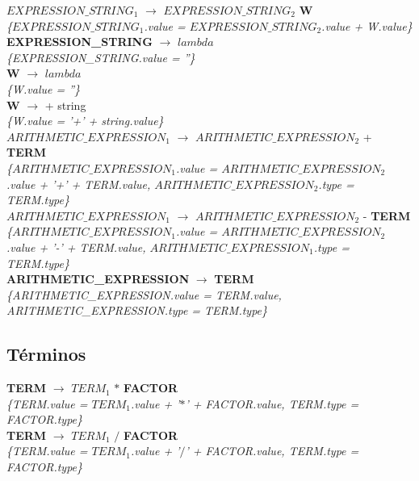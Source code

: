 \documentclass[10pt,a4paper]{article}
\begin{document}
\textbf{$EXPRESSION\_STRING_1$} $\rightarrow$ \textbf{$EXPRESSION\_STRING_2$} \textbf{W}
\\ \textit{\{$EXPRESSION\_STRING_1$.value =  $EXPRESSION\_STRING_2$.value + W.value\}} \\

\textbf{EXPRESSION\_STRING} $\rightarrow$  $lambda$ \\ 
\textit{\{EXPRESSION\_STRING.value = ''\}} \\

\textbf{W} $\rightarrow$  $lambda$ \\ 
\textit{\{W.value = ''\}} \\

\textbf{W} $\rightarrow$ + string \\ 
\textit{\{W.value = '+' + string.value\}} \\


\textbf{$ARITHMETIC\_EXPRESSION_1$} $\rightarrow$ \textbf{$ARITHMETIC\_EXPRESSION_2$} + \textbf{TERM} \\
\textit{\{$ARITHMETIC\_EXPRESSION_1$.value = $ARITHMETIC\_EXPRESSION_2$.value + '+' + TERM.value, $ARITHMETIC\_EXPRESSION_2$.type = TERM.type\}} \\

\textbf{$ARITHMETIC\_EXPRESSION_1$} $\rightarrow$ \textbf{$ARITHMETIC\_EXPRESSION_2$} - \textbf{TERM}  \\
\textit{\{$ARITHMETIC\_EXPRESSION_1$.value = $ARITHMETIC\_EXPRESSION_2$.value + '-' + TERM.value, $ARITHMETIC\_EXPRESSION_1$.type = TERM.type\}} \\

\textbf{ARITHMETIC\_EXPRESSION} $\rightarrow$ \textbf{TERM} \\
\textit{\{ARITHMETIC\_EXPRESSION.value = TERM.value, ARITHMETIC\_EXPRESSION.type = TERM.type\}}  \\

\subsection{Términos}
\textbf{TERM} $\rightarrow$ \textbf{$TERM_{1}$} $*$ \textbf{FACTOR}   \\
\textit{\{TERM.value = $TERM_{1}$.value + '$*$' + FACTOR.value, TERM.type = FACTOR.type\}} \\

\textbf{TERM} $\rightarrow$ \textbf{$TERM_{1}$} $/$ \textbf{FACTOR}   \\
\textit{\{TERM.value = $TERM_{1}$.value + '$/$' + FACTOR.value, TERM.type = FACTOR.type\}} \\
\end{document}
